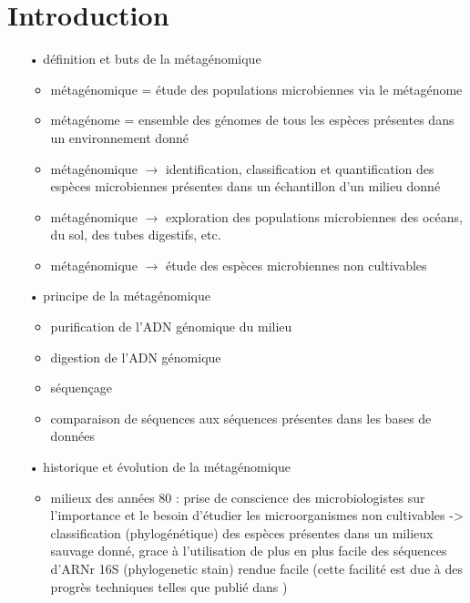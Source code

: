 \section{Introduction}

	\begin{itemize}
		\item[•] définition et buts de la métagénomique
		  \begin{itemize}
			\item métagénomique = étude des populations microbiennes via le métagénome
			\item métagénome = ensemble des génomes de tous les espèces présentes dans un environnement donné
			\item métagénomique $\rightarrow$ identification, classification et quantification des espèces microbiennes présentes dans un échantillon d'un milieu donné
                        \item métagénomique $\rightarrow$ exploration des populations microbiennes des océans, du sol, des tubes digestifs, etc.
                        \item métagénomique $\rightarrow$ étude des espèces microbiennes non cultivables
		  \end{itemize}
		\item[•] principe de la métagénomique
                  \begin{itemize}
                  \item purification de l'ADN génomique du milieu
                  \item digestion de l'ADN génomique
                  \item séquençage
                  \item comparaison de séquences aux séquences présentes dans les bases de données
                  \end{itemize}
                \item[•] historique et évolution de la métagénomique \cite{Handelsman2004a}
                  \begin{itemize}
                  \item milieux des années 80 : prise de conscience des microbiologistes sur l'importance et le besoin d'étudier les microorganismes non cultivables -> classification (phylogénétique) des espèces présentes dans un milieux sauvage donné, grace à l'utilisation de plus en plus facile des séquences d'ARNr 16S (phylogenetic stain) rendue facile (cette facilité est due à des progrès techniques telles que publié dans \cite{lane1985})

\end{itemize}
\end{itemize}
